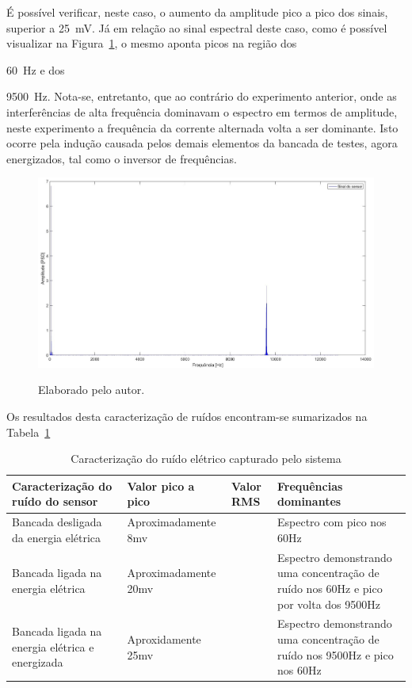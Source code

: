 \documentclass[
	12pt,				
	oneside,			
	a4paper,			
	english,			
	brazil,			
	]{abntex2ppgsi}
\begin{document}
{{{É possível verificar, neste caso, o aumento da amplitude pico a pico dos sinais, superior a {\SI{25}{\milli\volt}}. Já em relação ao sinal espectral deste caso, como é possível visualizar na Figura~\ref{PSD_SENSOR_MAQUINA_LIGADA_E_ENERGIZADA}, o mesmo aponta picos na região dos {\SI{60}{\hertz} e dos {\SI{9500}{\hertz}. Nota-se, entretanto, que ao contrário do experimento anterior, onde as interferências de alta frequência dominavam o espectro em termos de amplitude, neste experimento a frequência da corrente alternada volta a ser dominante. Isto ocorre pela indução causada pelos demais elementos da bancada de testes, agora energizados, tal como o inversor de frequências.   

\begin{figure}[H]
\centering
\caption {Elaborado pelo autor.}
\includegraphics[width=170mm,keepaspectratio]{Caso0/PSD_SENSOR_MAQUINA_LIGADA_E_ENERGIZADA}
\label{PSD_SENSOR_MAQUINA_LIGADA_E_ENERGIZADA}
\end{figure} 

Os resultados desta caracterização de ruídos encontram-se sumarizados na Tabela~\ref{tab:caraterizaçãoSinal}

\begin{table}[h]
\caption{Caracterização do ruído elétrico capturado pelo sistema}
\begin{tabularx}{\textwidth}{|X|X|X|X|}
\hline
Caracterização do ruído do sensor               & Valor pico a pico    & Valor RMS & Frequências dominantes                                                               \\ \hline
Bancada desligada da energia elétrica           & Aproximadamente 8mv  &           & Espectro com pico nos 60Hz                                                           \\ \hline
Bancada ligada na energia elétrica              & Aproximadamente 20mv &           & Espectro demonstrando uma concentração de ruído nos 60Hz e pico por volta dos 9500Hz \\ \hline
Bancada ligada na energia elétrica e energizada & Aproxidamente 25mv   &           & Espectro demonstrando uma concentração de ruído nos 9500Hz e pico nos 60Hz           \\ \hline
\end{tabularx}
\label{tab:caraterizaçãoSinal}
\end{table}


}}}}}
\end{document}
